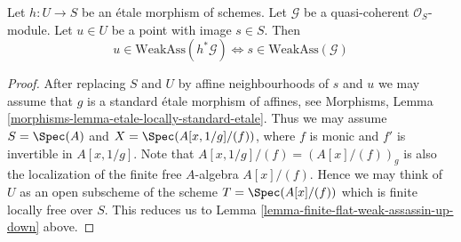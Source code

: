 \begin{lemma}
\label{lemma-etale-weak-assassin-up-down}
Let $h : U \to S$ be an \'etale morphism of schemes.
Let $\mathcal{G}$ be a quasi-coherent $\mathcal{O}_S$-module.
Let $u \in U$ be a point with image $s \in S$. Then
$$
u \in \text{WeakAss}(h^*\mathcal{G})
\Leftrightarrow
s \in \text{WeakAss}(\mathcal{G})
$$
\end{lemma}

\begin{proof}
After replacing $S$ and $U$ by affine neighbourhoods of $s$ and $u$
we may assume that $g$ is a standard \'etale morphism of affines, see
Morphisms, Lemma \ref{morphisms-lemma-etale-locally-standard-etale}.
Thus we may assume $S = \Spec(A)$ and
$X = \Spec(A[x, 1/g]/(f))$, where $f$ is monic and $f'$
is invertible in $A[x, 1/g]$.
Note that $A[x, 1/g]/(f) = (A[x]/(f))_g$ is also the localization
of the finite free $A$-algebra $A[x]/(f)$. Hence we may think of
$U$ as an open subscheme of the scheme $T = \Spec(A[x]/(f))$
which is finite locally free over $S$. This reduces us to
Lemma \ref{lemma-finite-flat-weak-assassin-up-down}
above.
\end{proof}
